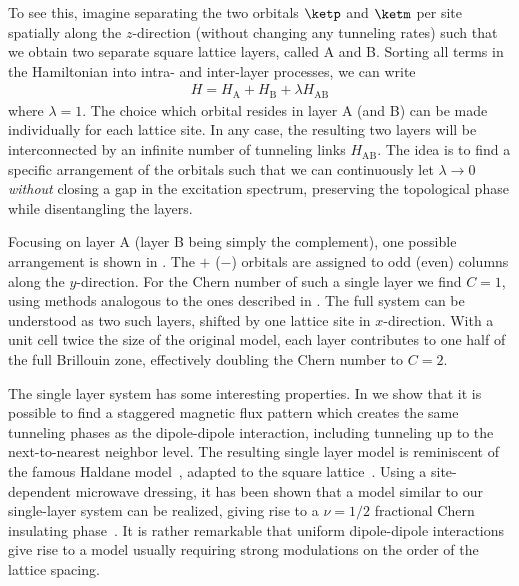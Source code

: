 To see this, imagine separating the two orbitals $\ketp$ and $\ketm$ per site spatially along the $z$-direction (without changing any tunneling rates) such that we obtain two separate square lattice layers, called A and B.
Sorting all terms in the Hamiltonian into intra- and inter-layer processes, we can write
\begin{align}
H=H_\text{A} + H_\text{B} + \lambda H_\text{AB}
\end{align}
where $\lambda=1$.
The choice which orbital resides in layer A (and B) can be made individually for each lattice site.
In any case, the resulting two layers will be interconnected by an infinite number of tunneling links $H_\text{AB}$.
The idea is to find a specific arrangement of the orbitals such that we can continuously let $\lambda \longrightarrow 0$ \emph{without} closing a gap in the excitation spectrum, preserving the topological phase while disentangling the layers.

Focusing on layer A (layer B being simply the complement), one possible arrangement is shown in .
The ${+}$ (${-}$) orbitals are assigned to odd (even) columns along the $y$-direction.
For the Chern number of such a single layer we find $C=1$, using methods analogous to the ones described in .
The full system can be understood as two such layers, shifted by one lattice site in $x$-direction.
With a unit cell twice the size of the original model, each layer contributes to one half of the full Brillouin zone, effectively doubling the Chern number to $C=2$.

The single layer system has some interesting properties.
In  we show that it is possible to find a staggered magnetic flux pattern which creates the same tunneling phases as the dipole-dipole interaction, including tunneling up to the next-to-nearest neighbor level.
The resulting single layer model is reminiscent of the famous Haldane model~\cite{Haldane1988}, adapted to the square lattice~\cite{Goldman2013,Li2008,Liu2010,Liu2011,Stanescu2010,Wang2011,Wang2014,Yao2012,Yao2013}.
Using a site-dependent microwave dressing, it has been shown that a model similar to our single-layer system can be realized, giving rise to a $\nu=1/2$ fractional Chern insulating phase~\cite{Yao2012,Yao2013}.
It is rather remarkable that uniform dipole-dipole interactions give rise to a model usually requiring strong modulations on the order of the lattice spacing.

